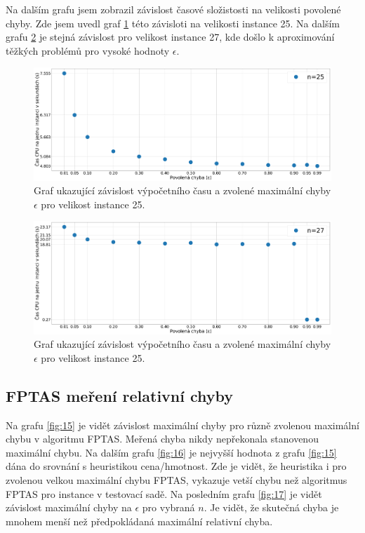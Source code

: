 \documentclass[11pt]{article}
\begin{document}
Na dalším grafu jsem zobrazil závislost časové složistosti na velikosti povolené chyby. Zde jsem uvedl graf \ref{fig:13} této závisloti na velikosti instance 25. Na dalším grafu \ref{fig:14} je stejná závislost pro velikost instance 27, kde došlo k aproximování těžkých problémů pro vysoké hodnoty $\epsilon$.
 
\begin{figure}[h]\centering
	\includegraphics[scale=0.2]{img/FPTASTimeEPS25}
 	\caption[2]{Graf ukazující závislost výpočetního času a zvolené maximální chyby $\epsilon$ pro velikost instance 25.}\label{fig:13}
 \end{figure} 	
 \begin{figure}[h]\centering
	\includegraphics[scale=0.2]{img/FPTASTimeEPS27}
 	\caption[2]{Graf ukazující závislost výpočetního času a zvolené maximální chyby $\epsilon$ pro velikost instance 25.}\label{fig:14}
 \end{figure} 	 
 
\subsection{FPTAS meření relativní chyby} 
 Na grafu \ref{fig:15} je vidět závislost maximální chyby pro různě zvolenou maximální chybu v algoritmu FPTAS. Meřená chyba nikdy nepřekonala stanovenou maximální chybu. Na dalším grafu \ref{fig:16} je nejvyšší hodnota z grafu \ref{fig:15} dána do srovnání s heuristikou cena/hmotnost. Zde je vidět, že heuristika i pro zvolenou velkou maximální chybu FPTAS, vykazuje vetší chybu než algoritmus FPTAS pro instance v testovací sadě. Na posledním grafu \ref{fig:17} je vidět závislost maximální chyby na $\epsilon$ pro vybraná $n$. Je vidět, že skutečná chyba je mnohem menší než předpokládaná maximální relativní chyba.
 
\end{document}
